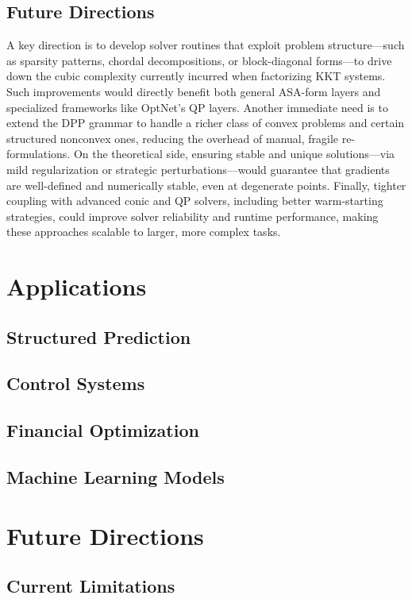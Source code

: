 \documentclass{article}
\begin{document}
\subsection{Future Directions}

A key direction is to develop solver routines that exploit problem structure—such as sparsity patterns, chordal decompositions, or block-diagonal forms—to drive down the cubic complexity currently incurred when factorizing KKT systems. Such improvements would directly benefit both general ASA-form layers and specialized frameworks like OptNet’s QP layers. Another immediate need is to extend the DPP grammar to handle a richer class of convex problems and certain structured nonconvex ones, reducing the overhead of manual, fragile re-formulations. On the theoretical side, ensuring stable and unique solutions—via mild regularization or strategic perturbations—would guarantee that gradients are well-defined and numerically stable, even at degenerate points. Finally, tighter coupling with advanced conic and QP solvers, including better warm-starting strategies, could improve solver reliability and runtime performance, making these approaches scalable to larger, more complex tasks.

\section{Applications}



\subsection{Structured Prediction}
\subsection{Control Systems}
\subsection{Financial Optimization}
\subsection{Machine Learning Models}

\section{Future Directions}
\subsection{Current Limitations}
\end{document}
